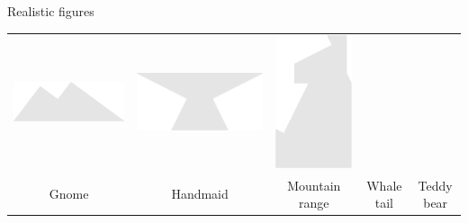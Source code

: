 \documentclass[14pt]{beamer}
\begin{document}
\begin{frame}{Realistic figures}
\begin{center}
{\begin{tabular}{ccccc}
                \!\!\includegraphics[scale=0.20]{figures/figure026v.pdf}\!\! &
                \includegraphics[scale=0.20]{figures/figure026d.pdf}  &
                \includegraphics[scale=0.20]{figures/figure026h.pdf} \\
                Gnome & Handmaid & \!\!Mountain range\!\! & Whale tail & Teddy bear \\[1.5ex]

\end{tabular}}
\end{center}
\end{frame}
\end{document}

